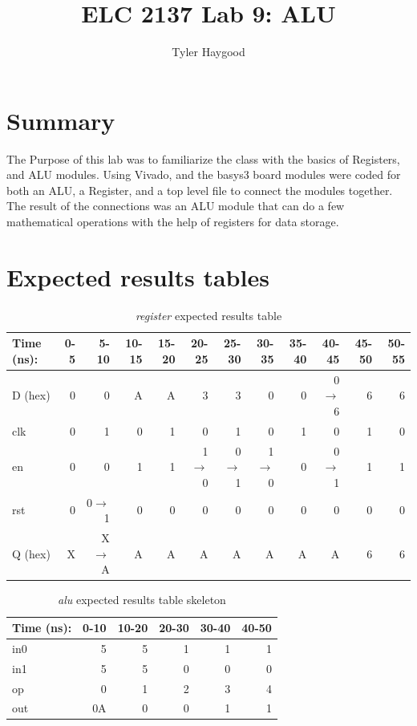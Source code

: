 \documentclass[]{report}
\begin{document}
	
	\title{ELC 2137 Lab 9: ALU}
	\author{Tyler Haygood}
	\maketitle
	
	\section*{Summary}
		The Purpose of this lab was to familiarize the class with the basics of Registers, and ALU modules. Using Vivado, and the basys3 board modules were coded for both an ALU, 
		a Register, and a top level file to connect the modules together. The result of the connections was an ALU module that can do a few mathematical operations with the help
		of registers for data storage. 
	
	\section*{Expected results tables}
	
	\begin{table}[ht]\centering
		  \caption{\textit{register} expected results table}
		  \label{ALU:tbl:register_ERT}\medskip
		  \begin{tabular}{l|rrrrrrrrrrr}
		  	Time (ns): 		   & 0-5 & 5-10 & 10-15 & 15-20 & 20-25 & 25-30 & 30-35 & 35-40& 40-45   &45-50 & 50-55 \\        \midrule
		  			   D (hex) & 0 	 & 0     & A 	& A 	& 3     & 3     & 0     & 0    & 0$\to$6 & 6    & 6 \\
		  			   clk     & 0   & 1     & 0 	& 1		& 0     & 1     & 0     & 1    & 0   	 & 1    & 0 \\
		  			   en      & 0   & 0       & 1 	& 1 	& 1$\to$0 & 0$\to$1 & 1$\to$0 & 0 & 0$\to$1& 1  & 1 \\
		  			   rst     & 0   & 0$\to$1 & 0 	& 0     & 0     & 0     & 0     & 0    & 0       & 0  & 0 \\ \midrule
		  			   Q (hex) & X   & X$\to$A & A 	& A 	& A      & A      & A      & A     & A   & 6    & 6 \\
		  			   \bottomrule
		  \end{tabular}
	\end{table}

	\begin{table}[ht]\centering
		\caption{\textit{alu} expected results table skeleton}
		\label{ALU:tbl:alu_ERT}\medskip
		\begin{tabular}{l|rrrrr}
			Time (ns): & 0-10 & 10-20 & 20-30 & 30-40 & 40-50  \\ \midrule
			in0		   &5     &5      &1      &1      &1       \\
			in1 	   &5     &5      &0      &0       &0      \\
			op    	   &0     &1      &2      &3      &4       \\\midrule
			out 	   &0A    &0      &0      &1      &1       \\\bottomrule
		\end{tabular}
	\end{table}
	
\end{document}
